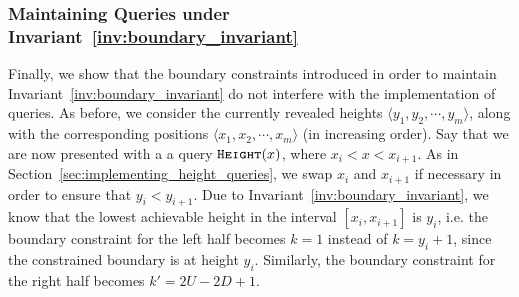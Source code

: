 \subsubsection{Maintaining  Queries under Invariant~\ref{inv:boundary_invariant}}
\label{sec:maintaining_height_queries_under_invariant}
Finally, we show that the boundary constraints introduced in order to maintain Invariant~\ref{inv:boundary_invariant}
do not interfere with the implementation of  queries.
As before, we consider the currently revealed heights $ \langle y_1, y_2,\cdots, y_m \rangle$,
along with the corresponding positions $ \langle x_1, x_2,\cdots, x_m \rangle$ (in increasing order).
Say that we are now presented with a a query $\texttt{\textsc{Height}}(x)$, where $x_i < x < x_{i+1}$.
As in Section~\ref{sec:implementing_height_queries}, we swap $x_i$ and $x_{i+1}$ if necessary in order to ensure that $y_i < y_{i+1}$.
Due to Invariant~\ref{inv:boundary_invariant}, we know that the lowest achievable height in the interval $[x_i, x_{i+1}]$ is $y_i$,
i.e. the boundary constraint for the left half becomes $k = 1$ instead of $k = y_i + 1$, since the constrained boundary is at height $y_i$.
Similarly, the boundary constraint for the right half becomes $k' = 2U - 2D + 1$.

